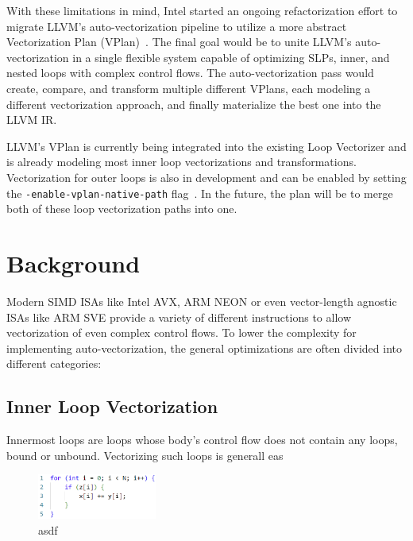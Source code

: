 \documentclass[sigplan,11pt,nonacm]{acmart}
\begin{document}
With these limitations in mind, Intel started an ongoing refactorization effort to migrate LLVM's
auto-vectorization pipeline to utilize a more abstract Vectorization Plan 
(VPlan)~\cite{llvmextloopvec,llvmvplan}. The final goal would be to unite LLVM's auto-vectorization
in a single flexible system capable of optimizing SLPs, inner, and nested loops with complex 
control flows. The auto-vectorization pass would create, compare, and transform multiple different 
VPlans, each modeling a different vectorization approach, and finally materialize the best one into
the LLVM IR.

LLVM's VPlan is currently being integrated into the existing Loop Vectorizer and is
already modeling most inner loop vectorizations and transformations. Vectorization for outer 
loops is also in development and can be enabled by setting the \texttt{-enable-vplan-native-path} 
flag~\cite{llvmouterloop}. In the future, the plan will be to merge both of these loop vectorization
paths into one.




\section{Background}
\label{sec:background}
Modern SIMD ISAs like Intel AVX, ARM NEON or even vector-length agnostic ISAs like ARM SVE provide
a variety of different instructions to allow vectorization of even complex control flows. To lower
the complexity for implementing auto-vectorization, the general optimizations are often divided
into different categories:

\subsection{Inner Loop Vectorization}
Innermost loops are loops whose body's control flow does not contain any loops, bound or unbound.
Vectorizing such loops is generall eas

\begin{figure}
  \centering
  \includegraphics[width=0.35\textwidth]{images/inner-loop-vec.png}
  \caption{asdf}
  \label{fig:inner-loop-vec}
\end{figure}
\end{document}
